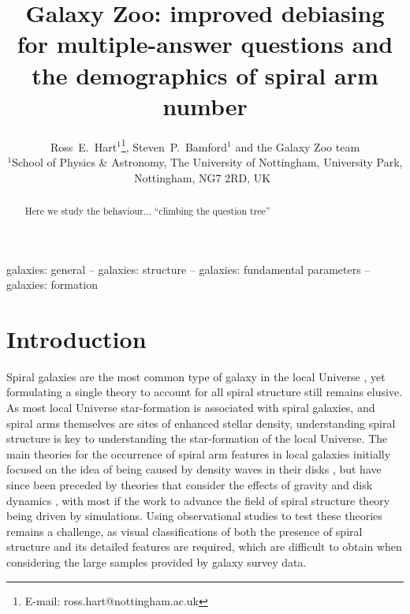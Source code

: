 \documentclass[useAMS,usenatbib]{mn2e}
\begin{document}
\title[Galaxy Zoo: debiasing and spiral arm number]{Galaxy Zoo: improved debiasing for multiple-answer questions and the demographics of spiral arm number}
\author[Hart et al.]{Ross~E.~Hart$^1$\thanks{E-mail: ross.hart@nottingham.ac.uk}, Steven~P.~Bamford$^1$ and the Galaxy Zoo team
\smallskip\\
$^{1}$School of Physics \& Astronomy, The University of Nottingham, University Park, Nottingham, NG7 2RD, UK\
}
\maketitle
\begin{abstract}
Here we study the behaviour...
``climbing the question tree''
\end{abstract}

\begin{keywords}
galaxies: general -- galaxies: structure -- galaxies: fundamental parameters -- galaxies: formation
\end{keywords}

\section{Introduction}
\label{sec:intro}
Spiral galaxies are the most common type of galaxy in the local Universe \citep{Lintott_11,Willett_13}, yet formulating a single theory to account for all spiral structure still remains elusive. As most local Universe star-formation is associated with spiral galaxies, and spiral arms themselves are sites of enhanced stellar density, understanding spiral structure is key to understanding the  star-formation of the local Universe. The main theories for the occurrence of spiral arm features in local galaxies initially focused on the idea of being caused by density waves in their disks \citep{Lindblad_63,Lin_64}, but have since been preceded by theories that consider the effects of gravity and disk dynamics \citep{Toomre_81,Sellwood_84}, with most if the work to advance the field of spiral structure theory being driven by simulations. Using observational studies to test these theories remains a challenge, as visual classifications of both the presence of spiral structure and its detailed features are required, which are difficult to obtain when considering the large samples provided by galaxy survey data.
\end{document}

